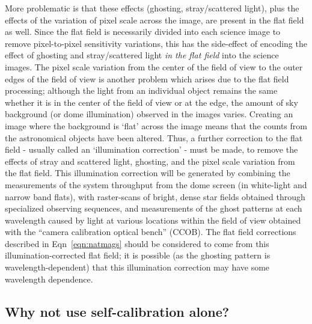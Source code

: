 \documentclass[12pt,preprint]{aastex}
\begin{document}
More problematic is that these effects (ghosting, stray/scattered
light), plus the effects of the variation of pixel scale across the
image, are present in the flat field as well. Since the flat field is
necessarily divided into each science image to remove pixel-to-pixel
sensitivity variations, this has the side-effect of encoding the
effect of ghosting and stray/scattered light {\it in the flat field}
into the science images. The pixel scale variation from the center of
the field of view to the outer edges of the field of view is another
problem which arises due to the flat field processing; although the
light from an individual object remains the same whether it is in the
center of the field of view or at the edge, the amount of sky
background (or dome illumination) observed in the images varies.
Creating an image where the background is `flat' across the image
means that the counts from the astronomical objects have been altered.
Thus, a further correction to the flat field - usually called
an `illumination correction' - must be made, to remove the effects of
stray and scattered light, ghosting, and the pixel scale variation
from the flat field. This illumination correction will be generated by
combining the measurements of the system throughput from the dome
screen (in white-light and narrow band flats), with raster-scans of
bright, dense star fields obtained through specialized observing
sequences, and measurements of the ghost patterns at each wavelength
caused by light at various locations within the field of view obtained
with the ``camera calibration optical bench'' (CCOB).  The flat field
corrections described in Eqn~\ref{eqn:natmags} should be considered to
come from this illumination-corrected flat field; it is possible (as
the ghosting pattern is wavelength-dependent) that this illumination
correction may have some wavelength dependence. 
 
\subsection{Why not use self-calibration alone?}
\end{document}
